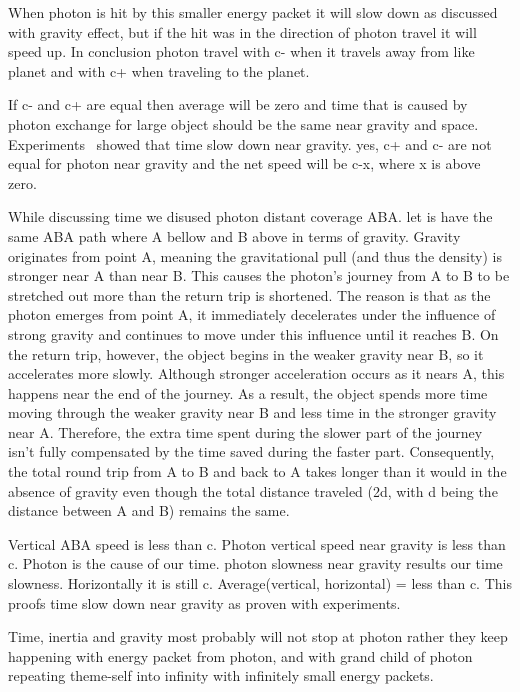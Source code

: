 \documentclass{article}
\begin{document}
    When photon is hit by this smaller energy packet it will slow down as discussed with gravity effect, but if the hit was in the direction of photon travel it will speed up.
    In conclusion photon travel with c- when it travels away from like planet and with c+ when traveling to the planet.

    If c- and c+ are equal then average will be zero and time that is caused by photon exchange for large object should be the same near gravity and space.
    Experiments~\cite{Ashby2002} showed that time slow down near gravity.
    yes, c+ and c- are not equal for photon near gravity and the net speed will be c-x, where x is above zero.

    While discussing time we disused photon distant coverage ABA. let is have the same ABA path where A bellow and B above in terms of gravity.
    Gravity originates from point A, meaning the gravitational pull (and thus the density) is stronger near A than near B. 
    This causes the photon’s journey from A to B to be stretched out more than the return trip is shortened.
    The reason is that as the photon emerges from point A, it immediately decelerates under the influence of strong gravity and continues to move under this influence until it reaches B.
    On the return trip, however, the object begins in the weaker gravity near B, so it accelerates more slowly. Although stronger acceleration occurs as it nears A, this happens near the end of the journey.
    As a result, the object spends more time moving through the weaker gravity near B and less time in the stronger gravity near A. 
    Therefore, the extra time spent during the slower part of the journey isn’t fully compensated by the time saved during the faster part.
    Consequently, the total round trip from A to B and back to A takes longer than it would in the absence of gravity even though the total distance traveled (2d, with d being the distance between A and B) remains the same.
    
    Vertical ABA speed is less than c.
    Photon vertical speed near gravity is less than c.
    Photon is the cause of our time.
    photon slowness near gravity results our time slowness.
     Horizontally it is still c.
     Average(vertical, horizontal) = less than c.
     This proofs time slow down near gravity as proven with experiments.

    Time, inertia and gravity most probably will not stop at photon rather they keep happening with energy packet from photon, and with grand child of photon repeating theme-self into infinity with infinitely small energy packets.
\end{document}

